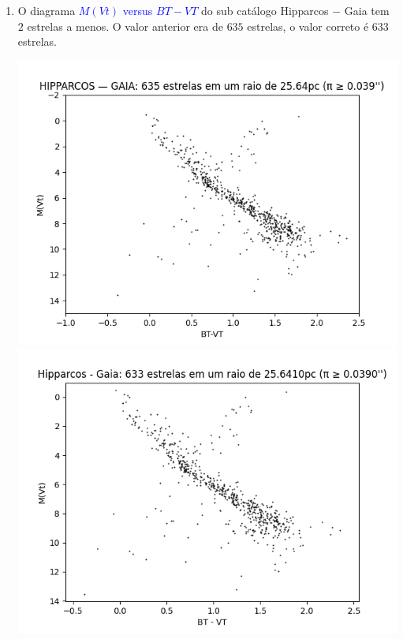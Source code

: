 \documentclass{article}
\begin{document}
\begin{enumerate}
	
		\newpage
	
		\item O diagrama \textcolor{blue}{$M(Vt)$ versus $BT-VT$} do sub catálogo Hipparcos $-$ Gaia tem $2$ estrelas a menos. O valor anterior era de $635$ estrelas, o valor correto é $633$ estrelas. 
		
		\begin{multicols}{2}
			\centering
			\includegraphics[width=.98\linewidth]{hipparcos_minus_gaia_mvt_versus_bt_minus_vt_plx_greater_than_or_iqual_to_0.039.png}
			\columnbreak
			\includegraphics[width=.98\linewidth]{Hipparcos_minus_Gaia_MVt_versus_BT_minus_VT.png}
		\end{multicols}
	

\end{enumerate}
\end{document}
